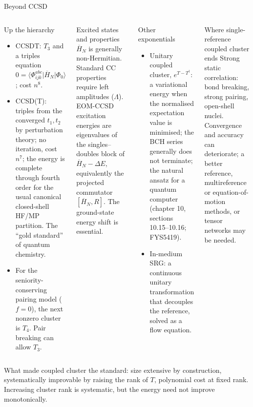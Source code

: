 \documentclass[aspectratio=169,10pt]{beamer}
\newcommand{\mel}[3]{\langle #1\lvert #2\rvert #3\rangle}
\newcommand{\ph}{\Phi_0}
\newcommand{\Hbar}{\overline{H}}
\begin{document}
\begin{frame}[shrink=16]{Beyond CCSD}
\footnotesize
\begin{columns}[T]
\begin{block}{Up the hierarchy}
\begin{itemize}
\item CCSDT: $T_3$ and a triples equation $0=\mel{\Phi_{ijk}^{abc}}{\Hbar_N}{\ph}$; cost $n^8$.
\item CCSD(T): triples from the converged $t_1,t_2$ by perturbation theory; no iteration, cost $n^7$; the energy is complete through fourth order for the usual canonical closed-shell HF/MP partition. The ``gold standard'' of quantum chemistry.
\item For the seniority-conserving pairing model ($f=0$), the next nonzero cluster is $T_4$. Pair breaking can allow $T_3$.
\end{itemize}
\end{block}
\begin{block}{Excited states and properties}
$\Hbar_N$ is generally non-Hermitian. Standard CC properties require left amplitudes ($\Lambda$). EOM-CCSD excitation energies are eigenvalues of the singles--doubles block of $\Hbar_N-\Delta E$, equivalently the projected commutator $[\Hbar_N,R]$. The ground-state energy shift is essential.
\end{block}
\begin{block}{Other exponentials}
\begin{itemize}
\item Unitary coupled cluster, $e^{T-T^\dagger}$: a variational energy when the normalised expectation value is minimised; the BCH series generally does not terminate; the natural ansatz for a quantum computer (chapter 10, sections 10.15--10.16; FYS5419).
\item In-medium SRG: a continuous unitary transformation that decouples the reference, solved as a flow equation.
\end{itemize}
\end{block}
\begin{block}{Where single-reference coupled cluster ends}
Strong static correlation: bond breaking, strong pairing, open-shell nuclei. Convergence and accuracy can deteriorate; a better reference, multireference or equation-of-motion methods, or tensor networks may be needed.
\end{block}
\end{columns}
\vspace{0.4em}
What made coupled cluster the standard: size extensive by construction, systematically improvable by raising the rank of $T$, polynomial cost at fixed rank. Increasing cluster rank is systematic, but the energy need not improve monotonically.
\end{frame}
\end{document}

